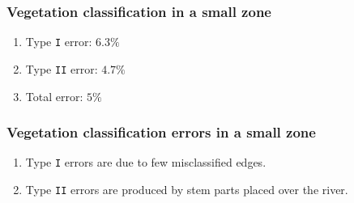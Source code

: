 \begin{frame}
  \frametitle{Vegetation classification in a small zone}
  \begin{table}
    \begin{center} 
    \end{center}
  \end{table}
  \begin{enumerate}
   \item Type \texttt{I} error: \alert{$6.3\%$}
   \item Type \texttt{II} error: \alert{$4.7\%$}
   \item Total error: \alert{$5\%$}
  \end{enumerate}
\end{frame}
\begin{frame}
  \frametitle{Vegetation classification errors in a small zone}
  \begin{enumerate}
    \item Type \texttt{I} errors are due to few misclassified edges. 
    \item Type \texttt{II} errors are produced by stem parts placed over the river.
  \end{enumerate}
  \begin{center}
  \end{center}
\end{frame}
